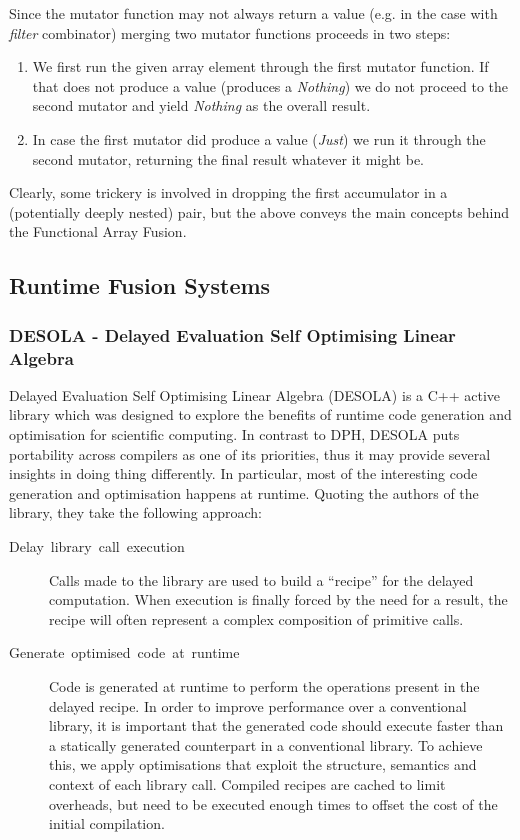\documentclass[preamble.tex]{subfiles}
\begin{document}
Since the mutator function may not always return a value (e.g. in the case with \emph{filter} combinator) merging two mutator functions proceeds in two steps:
\begin{enumerate}
\item We first run the given array element through the first mutator function. If that does not produce a value (produces a \emph{Nothing}) we do not proceed to the second mutator and yield \emph{Nothing} as the overall result.
\item In case the first mutator did produce a value (\emph{Just}) we run it through the second mutator, returning the final result whatever it might be.
\end{enumerate}
Clearly, some trickery is involved in dropping the first accumulator in a (potentially deeply nested) pair, but the above conveys the main concepts behind the Functional Array Fusion.


\subsection{Runtime Fusion Systems}

\subsubsection{DESOLA - Delayed Evaluation Self Optimising Linear Algebra}

Delayed Evaluation Self Optimising Linear Algebra (DESOLA) \cite{RMKB06} is a C++ active library which was designed to explore the benefits of runtime code generation and optimisation for scientific computing. In contrast to DPH, DESOLA puts portability across compilers as one of its priorities, thus it may provide several insights in doing thing differently. In particular, most of the interesting code generation and optimisation happens at runtime. Quoting the authors of the library, they take the following approach:

\begin{description}
\item [{Delay~library~call~execution}] Calls made to the library are used to build a “recipe” for the delayed computation. When execution is finally forced by the need for a result, the recipe will often represent a complex composition of primitive calls.
\item [{Generate~optimised~code~at~runtime}] Code is generated at runtime to perform the operations present in the delayed recipe. In order to improve performance over a conventional library, it is important that the generated code should execute faster than a statically generated counterpart in a conventional library. To achieve this, we apply optimisations that exploit the structure, semantics and context of each library call. Compiled recipes are cached to limit overheads, but need to be executed enough times to offset the cost of the initial compilation.
\end{description}
\end{document}
